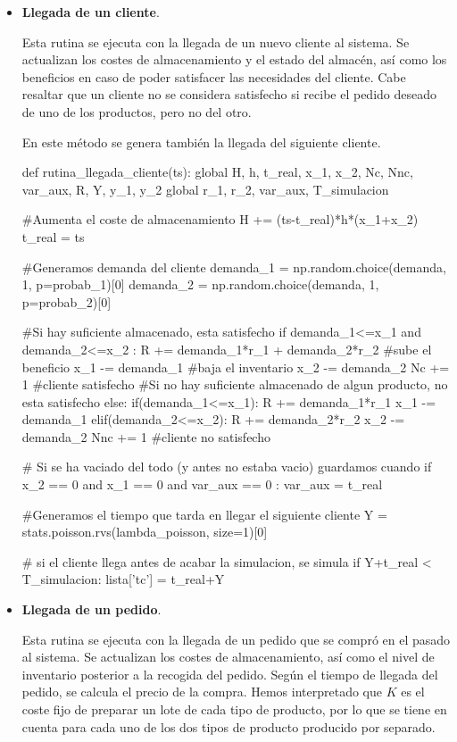\documentclass[a4paper,12pt]{article}
\begin{document}
	\begin{itemize}
		\item \textbf{Llegada de un cliente}. 
		
		Esta rutina se ejecuta con la llegada de un nuevo cliente al sistema. Se actualizan los costes de almacenamiento y el estado del almacén, así como los beneficios en caso de poder satisfacer las necesidades del cliente. 
		Cabe resaltar que un cliente no se considera satisfecho si recibe el pedido deseado de uno de los productos, pero no del otro.
		
		En este método se genera también la llegada del siguiente cliente.\\
		
		\begin{python}
def rutina_llegada_cliente(ts):
	global H, h, t_real, x_1, x_2, Nc, Nnc, var_aux, R, Y, y_1, y_2
	global r_1, r_2, var_aux, T_simulacion
	
	#Aumenta el coste de almacenamiento
	H += (ts-t_real)*h*(x_1+x_2)
	t_real = ts

	
	#Generamos demanda del cliente
	demanda_1 = np.random.choice(demanda, 1, p=probab_1)[0]
	demanda_2 = np.random.choice(demanda, 1, p=probab_2)[0]
	
	#Si hay suficiente almacenado, esta satisfecho
	if demanda_1<=x_1 and demanda_2<=x_2 :
		R += demanda_1*r_1 + demanda_2*r_2 #sube el beneficio
		x_1 -= demanda_1	 #baja el inventario
		x_2 -= demanda_2
		Nc += 1 #cliente satisfecho
	#Si no hay suficiente almacenado de algun producto, no esta satisfecho
	else:
		if(demanda_1<=x_1):
			R += demanda_1*r_1
			x_1 -= demanda_1
		elif(demanda_2<=x_2):
			R += demanda_2*r_2
			x_2 -= demanda_2
		Nnc += 1 #cliente no satisfecho
	
	# Si se ha vaciado del todo (y antes no estaba vacio) guardamos cuando
	if x_2 == 0 and x_1 == 0 and var_aux == 0 :
		var_aux = t_real

	
	#Generamos el tiempo que tarda en llegar el siguiente cliente
	Y = stats.poisson.rvs(lambda_poisson, size=1)[0]
	
	# si el cliente llega antes de acabar la simulacion, se simula
	if Y+t_real < T_simulacion:
		lista['tc'] = t_real+Y
		\end{python}
	
	\item \textbf{Llegada de un pedido}. 
	
	Esta rutina se ejecuta con la llegada de un pedido que se compró en el pasado al sistema. Se actualizan los costes de almacenamiento, así como el nivel de inventario posterior a la recogida del pedido. Según el tiempo de llegada del pedido, se calcula el precio de la compra.
	Hemos interpretado que $K$ es el coste fijo de preparar un lote de cada tipo de producto, por lo que se tiene en cuenta para cada uno de los dos tipos de producto producido por separado.\\
	

\end{itemize}
\end{document}
